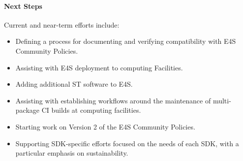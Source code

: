 \paragraph{Next Steps}
Current and near-term efforts include:

\begin{itemize}
\item  Defining a process for documenting and verifying compatibility with E4S Community Policies.
\item  Assisting with E4S deployment to computing Facilities.
\item  Adding additional ST software to E4S.
\item  Assisting with establishing workflows around the maintenance of multi-package CI builds at computing facilities.
\item  Starting work on Version 2 of the E4S Community Policies.
\item  Supporting SDK-specific efforts focused on the needs of each SDK, with a particular emphasis on sustainability.
\end{itemize}

